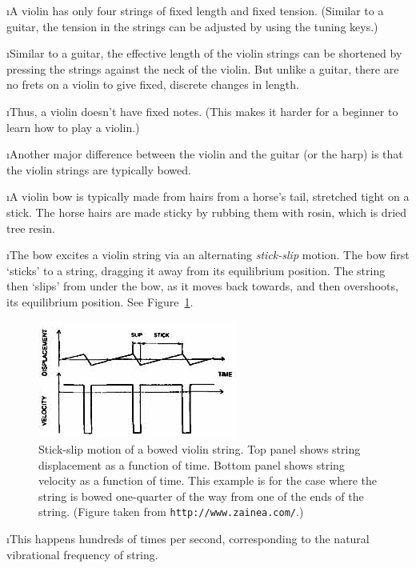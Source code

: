 \i A violin has only four strings of fixed length
and fixed tension.
(Similar to a guitar, 
the tension in the strings can be adjusted
by using the tuning keys.)

\i Similar to a guitar, the effective length of 
the violin strings can be shortened by pressing the 
strings against the neck of the violin.
But unlike a guitar, there are no frets on a violin 
to give fixed, discrete changes in length.

\i Thus, a violin doesn't have fixed notes.
(This makes it harder for a beginner to learn
how to play a violin.)

\i Another major difference between the violin and 
the guitar (or the harp) is that the violin strings 
are typically bowed.

\i A violin bow is typically made from hairs from
a horse's tail, stretched tight on a stick.
The horse hairs are made sticky by rubbing them
with rosin, which is dried tree resin.

\i The bow excites a violin string via an 
alternating {\em stick-slip} motion.
The bow first `sticks' to a string, dragging it 
away from its equilibrium position.
The string then `slips' from under the bow,
as it moves back towards, and then overshoots,
its equilibrium position.
See Figure~\ref{f:stickslip}.
%
\begin{figure}[htbp]
\begin{center}
\includegraphics[width=.6\textwidth]{stickslip.jpg}
\caption{Stick-slip motion of a bowed violin string.
Top panel shows string displacement as a function of time.
Bottom panel shows string velocity as a function of time.
This example is for the case where the string is bowed
one-quarter of the way from one of the ends of the string.
(Figure taken from {\tt http://www.zainea.com/}.)}
\label{f:stickslip}
\end{center}
\end{figure}

\i This happens hundreds of times per second, 
corresponding to the natural vibrational frequency 
of string.

